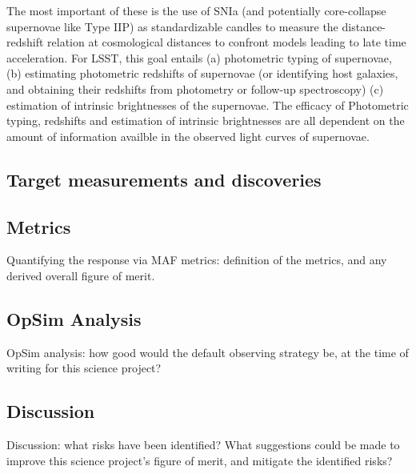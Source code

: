 The most important of these is the use of SNIa (and potentially core-collapse
supernovae like Type IIP) as standardizable candles to measure the distance-redshift relation at cosmological distances to confront models leading to late time
 acceleration. For LSST, this goal entails (a) photometric typing of supernovae,
 (b) estimating photometric redshifts of supernovae (or identifying host galaxies, and obtaining their redshifts from photometry or follow-up spectroscopy)
(c) estimation of intrinsic brightnesses of the supernovae. The efficacy of 
Photometric typing, redshifts and estimation of intrinsic brightnesses are all
dependent on the amount of information availble in the observed light curves of supernovae.


\subsection{Target measurements and discoveries}
\label{sec:keyword:targets}







\subsection{Metrics}
\label{sec:keyword:metrics}

Quantifying the response via MAF metrics: definition of the metrics,
and any derived overall figure of merit.



\subsection{OpSim Analysis}
\label{sec:keyword:analysis}

OpSim analysis: how good would the default observing strategy be, at
the time of writing for this science project?



\subsection{Discussion}
\label{sec:keyword:discussion}

Discussion: what risks have been identified? What suggestions could be
made to improve this science project's figure of merit, and mitigate
the identified risks?



